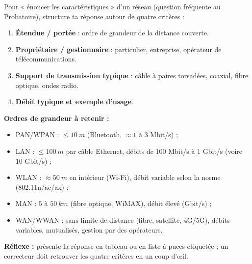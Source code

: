 \documentclass[11pt]{article}
\begin{document}
\begin{methode}
Pour « énoncer les caractéristiques » d'un réseau (question fréquente au Probatoire), structure ta réponse autour de quatre critères :
\begin{enumerate}
  \item \textbf{Étendue / portée} : ordre de grandeur de la distance couverte.
  \item \textbf{Propriétaire / gestionnaire} : particulier, entreprise, opérateur de télécommunications.
  \item \textbf{Support de transmission typique} : câble à paires torsadées, coaxial, fibre optique, ondes radio.
  \item \textbf{Débit typique et exemple d'usage}.
\end{enumerate}
\textbf{Ordres de grandeur à retenir :}
\begin{itemize}
  \item PAN/WPAN : $\leq \SI{10}{m}$ (Bluetooth, $\approx 1$ à $3$ Mbit/s) ;
  \item LAN : $\leq \SI{100}{m}$ par câble Ethernet, débits de $100$ Mbit/s à $1$ Gbit/s (voire $10$ Gbit/s) ;
  \item WLAN : $\approx \SI{50}{m}$ en intérieur (Wi-Fi), débit variable selon la norme (802.11n/ac/ax) ;
  \item MAN : $5$ à $\SI{50}{km}$ (fibre optique, WiMAX), débit élevé (Gbit/s) ;
  \item WAN/WWAN : sans limite de distance (fibre, satellite, 4G/5G), débits variables, mutualisés, gestion par des opérateurs.
\end{itemize}
\textbf{Réflexe :} présente la réponse en tableau ou en liste à puces étiquetée ; un correcteur doit retrouver les quatre critères en un coup d'œil.
\end{methode}
\end{document}
